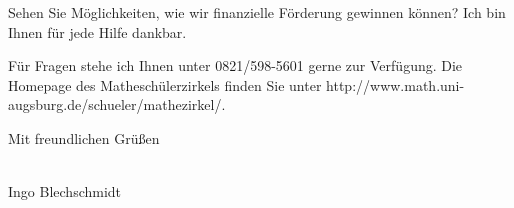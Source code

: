 \documentclass{zirkelbrief}
\begin{document}



Sehen Sie Möglichkeiten, wie wir finanzielle Förderung gewinnen können? Ich bin Ihnen für jede Hilfe dankbar.

Für Fragen stehe ich Ihnen unter 0821/598-5601 gerne zur Verfügung. Die
Homepage des Matheschülerzirkels finden Sie unter
\textsf{http:/\!/www.math.uni-augsburg.de/schue\-ler/mathezirkel/}.

Mit freundlichen Grüßen

\ \\

Ingo Blechschmidt
\end{document}
